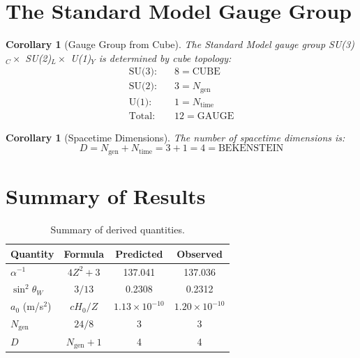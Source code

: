 \documentclass[twocolumn,showpacs,preprintnumbers,amsmath,amssymb,prd]{revtex4-2}
\newtheorem{corollary}[theorem]{Corollary}
\begin{document}
\section{The Standard Model Gauge Group}

\begin{corollary}[Gauge Group from Cube]
The Standard Model gauge group SU(3)$_C \times$ SU(2)$_L \times$ U(1)$_Y$ is determined by cube topology:
\begin{align}
\text{SU(3)}: & \quad 8 = \text{CUBE} \nonumber\\
\text{SU(2)}: & \quad 3 = N_{\text{gen}} \nonumber\\
\text{U(1)}: & \quad 1 = N_{\text{time}} \nonumber\\
\text{Total}: & \quad 12 = \text{GAUGE}
\end{align}
\end{corollary}

\begin{corollary}[Spacetime Dimensions]
The number of spacetime dimensions is:
\begin{equation}
D = N_{\text{gen}} + N_{\text{time}} = 3 + 1 = 4 = \text{BEKENSTEIN}
\end{equation}
\end{corollary}

\section{Summary of Results}

\begin{table}[h]
\centering
\begin{tabular}{|l|c|c|c|}
\hline
Quantity & Formula & Predicted & Observed \\
\hline
$\alpha^{-1}$ & $4Z^2 + 3$ & 137.041 & 137.036 \\
$\sin^2\theta_W$ & $3/13$ & 0.2308 & 0.2312 \\
$a_0$ (m/s$^2$) & $cH_0/Z$ & $1.13\times10^{-10}$ & $1.20\times10^{-10}$ \\
$N_{\text{gen}}$ & $24/8$ & 3 & 3 \\
$D$ & $N_{\text{gen}} + 1$ & 4 & 4 \\
\hline
\end{tabular}
\caption{Summary of derived quantities.}
\end{table}
\end{document}
